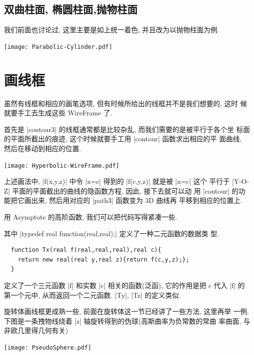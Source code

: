 \documentclass[nofonts,CJKnormalspaces]{ctexbook}
\begin{document}
\subsection{双曲柱面, 椭圆柱面,抛物柱面}
我们前面也讨论过, 这里主要是如上统一着色, 并且改为以抛物柱面为例.
\begin{center}\texttt{[image: Parabolic-Cylinder.pdf]}\end{center}%



\section{画线框}
虽然有线框和相应的画笔选项, 但有时候所给出的线框并不是我们想要的, 这时
候就要手工去生成这些 WireFrame 了.

首先是 |contour3| 的线框通常都是比较杂乱, 而我们需要的是被平行于各个坐
标面的平面所截出的痕迹, 这个时候就要手工用 |contour| 函数求出相应的平
面曲线, 然后在移动到相应的位置.
\begin{center}\texttt{[image: Hyperbolic-WireFrame.pdf]}\end{center}%

上述画法中, |f(x,y,z)| 中令 |x=c| 得到的 |f(c,y,z)| 就是被 |x=c| 这个
平行于 |Y-O-Z| 平面的平面截出的曲线的隐函数方程, 因此, 接下去就可以动
用 |contour| 的功能把它画出来, 然后用对应的 |path3| 函数变为 3D 曲线再
平移到相应的位置上.

用 Asymptote 的高阶函数, 我们可以把代码写得紧凑一些.

其中 |typedef real function(real,real);| 定义了一种二元函数的数据类
型.
\begin{lstlisting}
  function Tx(real f(real,real,real),real c){
    return new real(real y,real z){return f(c,y,z);};
  }
\end{lstlisting}
定义了一个三元函数 |f| 和实数 |c| 相关的函数(泛函), 它的作用是把 c 代入
|f| 的第一个元中, 从而返回一个二元函数. |Ty|, |Tz| 的定义类似.

旋转体画线框更成熟一些, 前面在旋转体这一节已经讲了一些方法, 这里再举
一例. 下图是一条拽物线绕着 |z| 轴旋转得到的伪球(高斯曲率为负常数的常曲
率曲面, 与非欧几里得几何有关)
\begin{center}\texttt{[image: PseudoSphere.pdf]}\end{center}%

\end{document}
